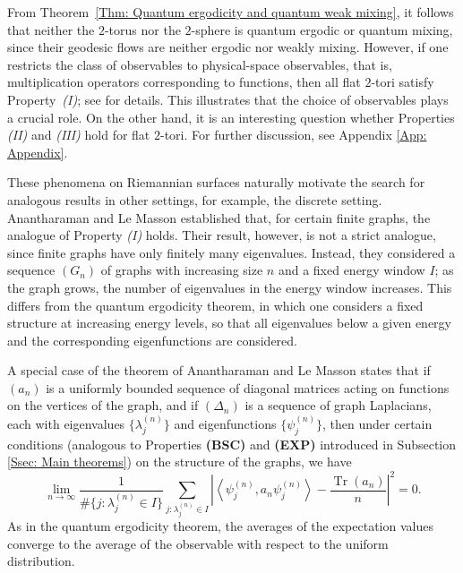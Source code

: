 \documentclass[11pt,twoside,reqno]{amsart} \usepackage{a4wide} \usepackage[T1]{fontenc} \usepackage[utf8]{inputenc} \usepackage{soul}  \usepackage{amsmath} \usepackage{amsfonts} \usepackage{amssymb} \usepackage{mathtools} \usepackage{amsthm} \usepackage{xcolor} \usepackage{graphicx} \usepackage{hyperref} \usepackage{standalone} \usepackage{esint} \usepackage{comment} \usepackage[left=2.3cm,top=3cm,right=2.3cm]{geometry} \usepackage{bm} \usepackage{svg} \usepackage{float} \numberwithin{equation}{section} \theoremstyle{plain} \newtheorem{thm}{Theorem}[section] \newtheorem{theorem}[thm]{Theorem} \newtheorem*{theorem*}{Theorem}\newtheorem{conj}[thm]{Conjecture} \newtheorem{lemma}[thm]{Lemma} \newtheorem{prop}[thm]{Proposition} \newtheorem{proposition}[thm]{Proposition} \newtheorem{cor}[thm]{Corollary} \newtheorem{question}[thm]{Question} \newtheorem{corollary}[thm]{Corollary} \newtheorem{assumption}[thm]{Assumption} \theoremstyle{definition} \newtheorem{defn}[thm]{Definition} \newtheorem{choice}[thm]{Choice} \newtheorem{definition}[thm]{Definition} \newtheorem{ex}[thm]{Example} \newtheorem{notation}[thm]{Notation} \newtheorem*{ack}{Acknowledgements} \theoremstyle{remark} \newtheorem{remark}[thm]{Remark} \newtheorem{bigremark}[thm]{Remark} \usepackage{xcolor} \newcommand{\red}[1]{ {\color{Red}#1} } \newcommand{\blue}[1]{ {\color{Blue}#1} } \author{Kai Hippi} \address{Aalto University, Espoo, Finland} \email{kai.hippi@aalto.fi}
\begin{document}
From Theorem~\ref{Thm: Quantum ergodicity and quantum weak mixing}, it follows that neither the $2$-torus nor the $2$-sphere is quantum ergodic or quantum mixing, since their geodesic flows are neither ergodic nor weakly mixing. However, if one restricts the class of observables to physical-space observables, that is, multiplication operators corresponding to functions, then all flat $2$-tori satisfy Property~\emph{(I)}; see \cite{MR12} for details. This illustrates that the choice of observables plays a crucial role. On the other hand, it is an interesting question whether Properties \emph{(II)} and \emph{(III)} hold for flat $2$-tori. For further discussion, see Appendix \ref{App: Appendix}.

These phenomena on Riemannian surfaces naturally motivate the search for analogous results in other settings, for example, the discrete setting. Anantharaman and Le Masson \cite{AL15} established that, for certain finite graphs, the analogue of Property \emph{(I)} holds. Their result, however, is not a strict analogue, since finite graphs have only finitely many eigenvalues. Instead, they considered a sequence $(G_n)$ of graphs with increasing size $n$ and a fixed energy window $I$; as the graph grows, the number of eigenvalues in the energy window increases. This differs from the quantum ergodicity theorem, in which one considers a fixed structure at increasing energy levels, so that all eigenvalues below a given energy and the corresponding eigenfunctions are considered. 

A special case of the theorem of Anantharaman and Le Masson \cite{AL15} states that if $(a_n)$ is a uniformly bounded sequence of diagonal matrices acting on functions on the vertices of the graph, and if $(\Delta_n)$ is a sequence of graph Laplacians, each with eigenvalues $\{ \lambda_j^{(n)} \}$ and eigenfunctions $\{ \psi_j^{(n)} \}$, then under certain conditions (analogous to Properties \textbf{(BSC)} and \textbf{(EXP)} introduced in Subsection \ref{Ssec: Main theorems}) on the structure of the graphs, we have
\[
\lim_{n \to \infty} \frac{1}{\# \{ j : \lambda_j^{(n)} \in I \} } 
\sum_{j:\lambda_j^{(n)} \in I} 
\left| \left\langle \psi_j^{(n)}, a_n \psi_j^{(n)} \right\rangle - \frac{\operatorname{Tr}(a_n)}{n} \right|^2 = 0.
\]
As in the quantum ergodicity theorem, the averages of the expectation values converge to the average of the observable with respect to the uniform distribution.
\end{document}
